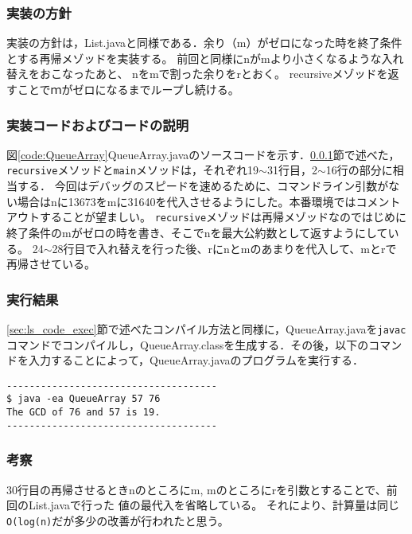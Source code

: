 \documentclass[10.5pt,a4paper]{jsarticle}
\newcommand{\figref}[1]{図\ref{#1}}
\newcommand{\secref}[1]{\ref{#1}節}
\begin{document}
\subsubsection{実装の方針}\label{sec:bs_impl_policy}
実装の方針は，List.javaと同様である．余り（m）がゼロになった時を終了条件とする再帰メゾッドを実装する。
前回と同様にnがmより小さくなるような入れ替えをおこなったあと、
nをmで割った余りをrとおく。
recursiveメゾッドを返すことでｍがゼロになるまでループし続ける。

\subsubsection{実装コードおよびコードの説明}

\figref{code:QueueArray}QueueArray.javaのソースコードを示す．\secref{sec:bs_impl_policy}で述べた，\texttt{recursive}メソッドと\texttt{main}メソッドは，それぞれ19$\sim$31行目，2$\sim$16行の部分に相当する．
今回はデバッグのスピードを速めるために、コマンドライン引数がない場合はnに13673をmに31640を代入させるようにした。本番環境ではコメントアウトすることが望ましい。
\texttt{recursive}メゾッドは再帰メゾッドなのではじめに終了条件のmがゼロの時を書き、そこでnを最大公約数として返すようにしている。
24$\sim$28行目で入れ替えを行った後、rにnとmのあまりを代入して、mとrで再帰させている。

\subsubsection{実行結果}

\secref{sec:ls_code_exec}で述べたコンパイル方法と同様に，QueueArray.javaを\texttt{javac}コマンドでコンパイルし，QueueArray.classを生成する．その後，以下のコマンドを入力することによって，QueueArray.javaのプログラムを実行する．
\begin{verbatim}
-------------------------------------
$ java -ea QueueArray 57 76
The GCD of 76 and 57 is 19.
-------------------------------------
\end{verbatim}

\subsubsection{考察}

30行目の再帰させるときnのところにm, mのところにrを引数とすることで、前回のList.javaで行った
値の最代入を省略している。
それにより、計算量は同じ\texttt{O(log(n)}だが多少の改善が行われたと思う。
\end{document}
